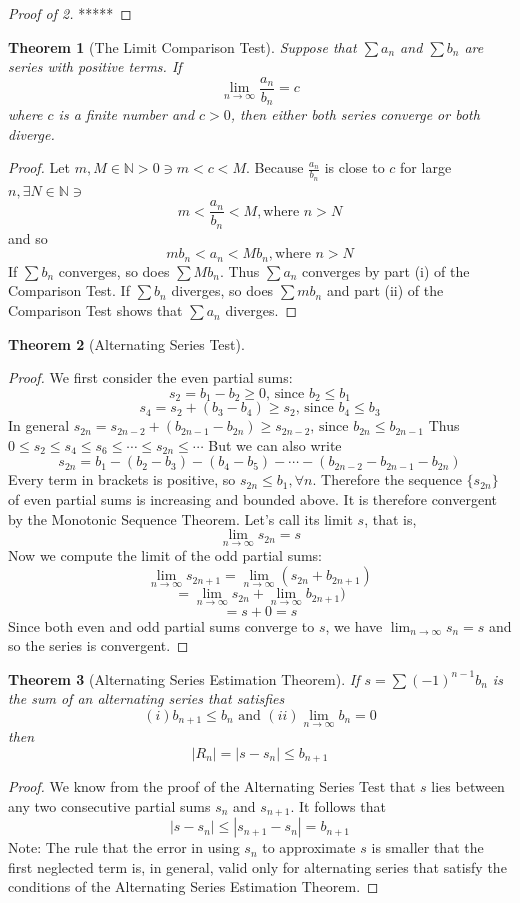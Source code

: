 \documentclass[10pt]{report}
\newtheorem{thm2}{Theorem}[section]
\begin{document}
\begin{proof}[Proof of 2]
*****
\end{proof}
\begin{thm2}[The Limit Comparison Test]
Suppose that $\sum a_n$ and $\sum b_n$ are series with positive terms. If
$$\lim_{n\to \infty} \frac{a_n}{b_n} = c$$
where $c$ is a finite number and $c>0$, then either both series converge or both diverge.
\end{thm2}
\begin{proof}
Let $m, M\in \mathbb{N}>0\ni m<c<M$. Because $\frac{a_n}{b_n}$ is close to $c$ for large $n,\exists N\in\mathbb{N}\ni$
$$m<\frac{a_n}{b_n}<M, \text{where } n>N$$
and so
$$mb_n < a_n < Mb_n, \text{where } n>N$$
If $\sum b_n$ converges, so does $\sum Mb_n$. Thus $\sum a_n$ converges by part (i) of the Comparison Test. If $\sum b_n$ diverges, so does $\sum mb_n$ and part (ii) of the Comparison Test shows that $\sum a_n$ diverges.
\end{proof}
\begin{thm2}[Alternating Series Test]
\end{thm2}
\begin{proof}
We first consider the even partial sums:
$$s_2=b_1-b_2\geq 0 \text{, since } b_2\leq b_1$$
$$s_4=s_2+(b_3-b_4)\geq s_2 \text{, since } b_4\leq b_3$$
In general $s_{2n} = s_{2n-2}+(b_{2n-1} - b_{2n})\geq s_{2n-2} \text{, since }b_{2n}\leq b_{2n-1}$
Thus
$0\leq s_2\leq s_4\leq s_6\leq \cdots \leq s_{2n} \leq \cdots$
But we can also write
$$s_{2n}=b_1-(b_2-b_3)-(b_4-b_5)-\cdots - (b_{2n-2} - b_{2n-1}-b_{2n})$$
Every term in brackets is positive, so $s_{2n}\leq b_1, \forall n$. Therefore the sequence $\{s_{2n}\}$ of even partial sums is increasing and bounded above. It is therefore convergent by the Monotonic Sequence Theorem. Let's call its limit $s$, that is,
$$\lim_{n\to \infty}s_{2n}=s$$
Now we compute the limit of the odd partial sums:
$$\lim_{n\to \infty}s_{2n+1}=\lim_{n\to \infty}(s_{2n}+b_{2n+1})$$
$$=\lim_{n\to \infty}s_{2n}+\lim_{n\to \infty}b_{2n+1})$$
$$=s+0 = s$$
Since both even and odd partial sums converge to $s$, we have $\lim_{n\to\infty}s_n=s$ and so the series is convergent.
\end{proof}
\begin{thm2}[Alternating Series Estimation Theorem]
If $s=\sum (-1)^{n-1}b_n$ is the sum of an alternating series that satisfies
$$(i)b_{n+1}\leq b_n \text{   and   } (ii)\lim_{n\to\infty}b_n=0$$
then
$$|R_n|=|s-s_n|\leq b_{n+1}$$
\end{thm2}
\begin{proof}
We know from the proof of the Alternating Series Test that $s$ lies between any two consecutive partial sums $s_n$ and $s_{n+1}$. It follows that
$$|s-s_n|\leq |s_{n+1}-s_n|=b_{n+1}$$
Note: The rule that the error in using $s_n$ to approximate $s$ is smaller that the first neglected term is, in general, valid only for alternating series that satisfy the conditions of the Alternating Series Estimation Theorem.
\end{proof}
\end{document}
